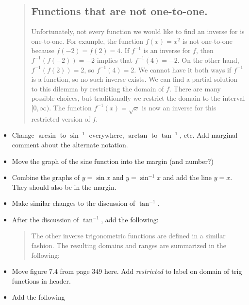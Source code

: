 \documentclass[12pt]{report}
\begin{document}
\begin{itemize}
\begin{quote}
\subsection*{Functions that are not one-to-one.}

Unfortunately, not every function we would like to find an inverse for is one-to-one. For example, the function $f(x)=x^2$ is not one-to-one because $f(-2)=f(2)=4$. If $f^{-1}$ is an inverse for $f$, then $f^{-1}(f(-2))=-2$ implies that $f^{-1}(4)=-2$. On the other hand, $f^{-1}(f(2))=2$, so $f^{-1}(4)=2$. We cannot have it both ways if $f^{-1}$ is a function, so no such inverse exists. We can find a partial solution to this dilemma by restricting the domain of $f$. There are many possible choices, but traditionally we restrict the domain to the interval $[0,\infty)$. The function $f^{-1}(x)=\sqrt x$ is now an inverse for this restricted version of $f$. 
\end{quote}

\item Change $\arcsin$ to $\sin^{-1}$ everywhere, $\arctan$ to $\tan^{-1}$, etc. Add marginal comment about the alternate notation.

\item Move the graph of the sine function into the margin (and number?)

\item Combine the graphs of $y=\sin x$ and $y=\sin^{-1}x$ and add the line $y=x$. They should also be in the margin.

\item Make similar changes to the discussion of $\tan^{-1}$.

\item After the discussion of $\tan^{-1}$, add the following:

\begin{quote}
The other inverse trigonometric functions are defined in a similar fashion. The resulting domains and ranges are summarized in the following:
\end{quote}

\item Move figure 7.4 from page 349 here. Add \emph{restricted} to label on domain of trig functions in header.

\item Add the following


\end{itemize}
\end{document}
